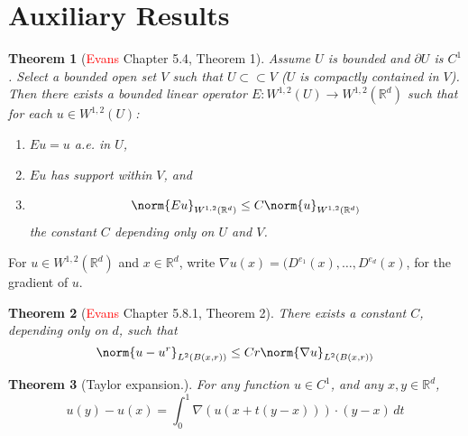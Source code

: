 \documentclass{article}
\newcommand{\Reals}{\mathbb{R}}
\newcommand{\1}{\mathbf{1}}
\newcommand{\Rd}{\Reals^d}
\theoremstyle{alden}
\theoremstyle{aldenthm}
\newtheorem{theorem}{Theorem}
\theoremstyle{definition}
\theoremstyle{remark}
\begin{document}
\section{Auxiliary Results}

\begin{theorem}[\textcolor{red}{Evans} Chapter 5.4, Theorem 1]
	\label{thm:evans_extension}
	Assume $U$ is bounded and $\partial U$ is $C^1$. Select a bounded open set $V$ such that $U \subset \subset V$ ($U$ is compactly contained in $V$). Then there exists a bounded linear operator $E: W^{1,2}(U) \to W^{1,2}(\Rd)$ such that for each $u \in W^{1,2}(U)$:
	\begin{enumerate}
		\item $Eu = u$ a.e. in $U$,
		\item $Eu$ has support within $V$, and 
		\item 
		\begin{equation*}
		\norm{Eu}_{W^{1,2}(\Rd)} \leq C \norm{u}_{W^{1,2}(\Rd)}
		\end{equation*}
		the constant $C$ depending only on $U$ and $V$.
	\end{enumerate}
\end{theorem}

For $u \in W^{1,2}(\Rd)$ and $x \in \Rd$, write $\nabla u(x) = (D^{e_1}(x),\ldots,D^{e_d}(x)$, for the gradient of $u$.

\begin{theorem}[\textcolor{red}{Evans} Chapter 5.8.1, Theorem 2]
	\label{thm:evans_poincare}
	There exists a constant $C$, depending only on $d$, such that
	\begin{equation*}
	\norm{u - u^r}_{L^2(B(x,r))} \leq Cr\norm{\nabla u}_{L^2(B(x,r))}
	\end{equation*}
\end{theorem}

\begin{theorem}[Taylor expansion.]
	\label{thm:taylor_expansion}
	For any function $u \in C^1$, and any $x,y \in \Rd$, 
	\begin{equation*}
	u(y) - u(x) = \int_{0}^{1} \nabla(u(x + t(y - x))) \cdot (y - x) \,dt
	\end{equation*}
\end{theorem}
\end{document}
